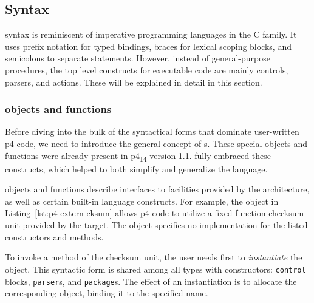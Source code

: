\subsection{Syntax}




\pfs syntax is reminiscent of imperative programming languages in the C family.
It uses prefix notation for typed bindings, braces for lexical scoping blocks,
and semicolons to separate statements. However, instead of general-purpose
procedures, the top level constructs for executable code are mainly controls,
parsers, and actions. These will be explained in detail in this section.

\subsubsection*{\extern objects and functions}

Before diving into the bulk of the syntactical forms that dominate user-written
\acrshort{p4} code, we need to introduce the general concept of \extern{}s.
These special objects and functions were already present in
\acrshort{p4}\textsubscript{14} version 1.1. \pfs fully embraced these
constructs, which helped to both simplify and generalize the language.

\extern objects and functions describe interfaces to facilities provided by the
architecture, as well as certain built-in language constructs. For example, the \extern object in
Listing~\ref{lst:p4-extern-cksum} allows \acrshort{p4} code to utilize a
fixed-function checksum unit provided by the target. The object specifies no
implementation for the listed constructors and methods.

To invoke a method of the checksum unit, the user needs first to
\emph{instantiate} the \extern object. This syntactic form is shared among all
types with constructors: \texttt{control} blocks, \texttt{parser}s, and
\texttt{package}s. The effect of an instantiation
is to allocate the corresponding object, binding it to the specified name.

